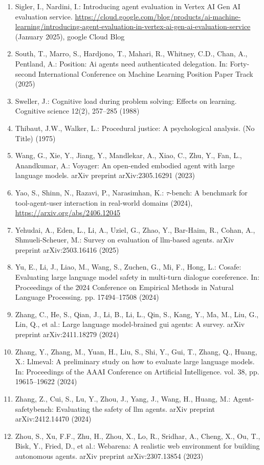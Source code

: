 \documentclass[11pt,UTF8,fontset=fandol]{ctexart}
\begin{document}
\begin{enumerate}[leftmargin=2em,labelsep=0.6em]
\item Sigler, I., Nardini, I.: Introducing agent evaluation in Vertex AI Gen AI evaluation service. \url{https://cloud.google.com/blog/products/ai-machine-learning/introducing-agent-evaluation-in-vertex-ai-gen-ai-evaluation-service} (January 2025), google Cloud Blog
\item South, T., Marro, S., Hardjono, T., Mahari, R., Whitney, C.D., Chan, A., Pentland, A.: Position: Ai agents need authenticated delegation. In: Forty-second International Conference on Machine Learning Position Paper Track (2025)
\item Sweller, J.: Cognitive load during problem solving: Effects on learning. Cognitive science 12(2), 257--285 (1988)
\item Thibaut, J.W., Walker, L.: Procedural justice: A psychological analysis. (No Title) (1975)
\item Wang, G., Xie, Y., Jiang, Y., Mandlekar, A., Xiao, C., Zhu, Y., Fan, L., Anandkumar, A.: Voyager: An open-ended embodied agent with large language models. arXiv preprint arXiv:2305.16291 (2023)
\item Yao, S., Shinn, N., Razavi, P., Narasimhan, K.: $\tau$-bench: A benchmark for tool-agent-user interaction in real-world domains (2024), \url{https://arxiv.org/abs/2406.12045}
\item Yehudai, A., Eden, L., Li, A., Uziel, G., Zhao, Y., Bar-Haim, R., Cohan, A., Shmueli-Scheuer, M.: Survey on evaluation of llm-based agents. arXiv preprint arXiv:2503.16416 (2025)
\item Yu, E., Li, J., Liao, M., Wang, S., Zuchen, G., Mi, F., Hong, L.: Cosafe: Evaluating large language model safety in multi-turn dialogue coreference. In: Proceedings of the 2024 Conference on Empirical Methods in Natural Language Processing. pp. 17494--17508 (2024)
\item Zhang, C., He, S., Qian, J., Li, B., Li, L., Qin, S., Kang, Y., Ma, M., Liu, G., Lin, Q., et al.: Large language model-brained gui agents: A survey. arXiv preprint arXiv:2411.18279 (2024)
\item Zhang, Y., Zhang, M., Yuan, H., Liu, S., Shi, Y., Gui, T., Zhang, Q., Huang, X.: Llmeval: A preliminary study on how to evaluate large language models. In: Proceedings of the AAAI Conference on Artificial Intelligence. vol. 38, pp. 19615--19622 (2024)
\item Zhang, Z., Cui, S., Lu, Y., Zhou, J., Yang, J., Wang, H., Huang, M.: Agent-safetybench: Evaluating the safety of llm agents. arXiv preprint arXiv:2412.14470 (2024)
\item Zhou, S., Xu, F.F., Zhu, H., Zhou, X., Lo, R., Sridhar, A., Cheng, X., Ou, T., Bisk, Y., Fried, D., et al.: Webarena: A realistic web environment for building autonomous agents. arXiv preprint arXiv:2307.13854 (2023)
\end{enumerate}
\end{document}
